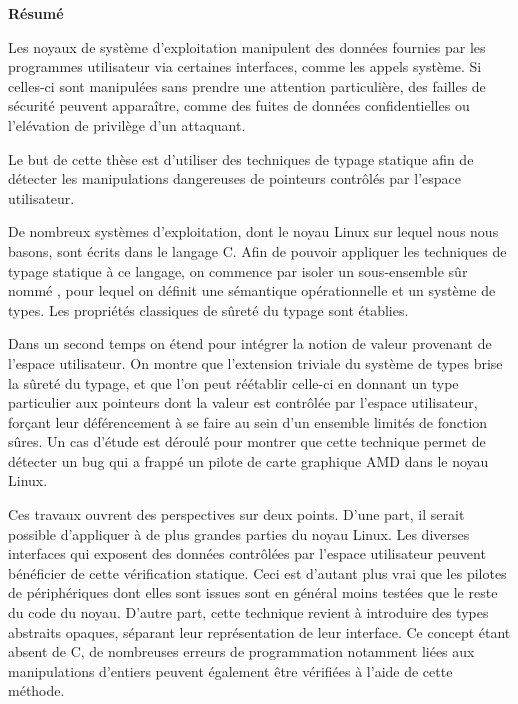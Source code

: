 \cleartoverso
{}

\begin{headingpage}
\thispagestyle{empty}

\begin{center}\Large \textbf{Résumé}\end{center}

Les noyaux de système d'exploitation manipulent des données fournies par
les programmes utilisateur via certaines interfaces, comme les appels système.
Si celles-ci sont manipulées sans prendre une attention particulière, des
failles de sécurité peuvent apparaître, comme des fuites de données
confidentielles ou l'elévation de privilège d'un attaquant.

Le but de cette thèse est d'utiliser des techniques de typage statique afin de
détecter les manipulations dangereuses de pointeurs contrôlés par l'espace
utilisateur.

De nombreux systèmes d'exploitation, dont le noyau Linux sur lequel nous nous
basons, sont écrits dans le langage C. Afin de pouvoir appliquer les techniques
de typage statique à ce langage, on commence par isoler un sous-ensemble sûr
nommé \langname, pour lequel on définit une sémantique opérationnelle et un
système de types. Les propriétés classiques de sûreté du typage sont établies.

Dans un second temps on étend \langname pour intégrer la notion de valeur
provenant de l'espace utilisateur. On montre que l'extension triviale du système
de types brise la sûreté du typage, et que l'on peut réétablir celle-ci en
donnant un type particulier aux pointeurs dont la valeur est contrôlée par
l'espace utilisateur, forçant leur déférencement à se faire au sein d'un
ensemble limités de fonction sûres. Un cas d'étude est déroulé pour montrer que
cette technique permet de détecter un bug qui a frappé un pilote de carte
graphique AMD dans le noyau Linux.

Ces travaux ouvrent des perspectives sur deux points. D'une part, il serait
possible d'appliquer à de plus grandes parties du noyau Linux. Les diverses
interfaces qui exposent des données contrôlées par l'espace utilisateur peuvent
bénéficier de cette vérification statique. Ceci est d'autant plus vrai que les
pilotes de périphériques dont elles sont issues sont en général moins testées
que le reste du code du noyau. D'autre part, cette technique revient à
introduire des types abstraits opaques, séparant leur représentation de leur
interface. Ce concept étant absent de C, de nombreuses erreurs de programmation
notamment liées aux manipulations d'entiers peuvent également être vérifiées à
l'aide de cette méthode.


\end{headingpage}
